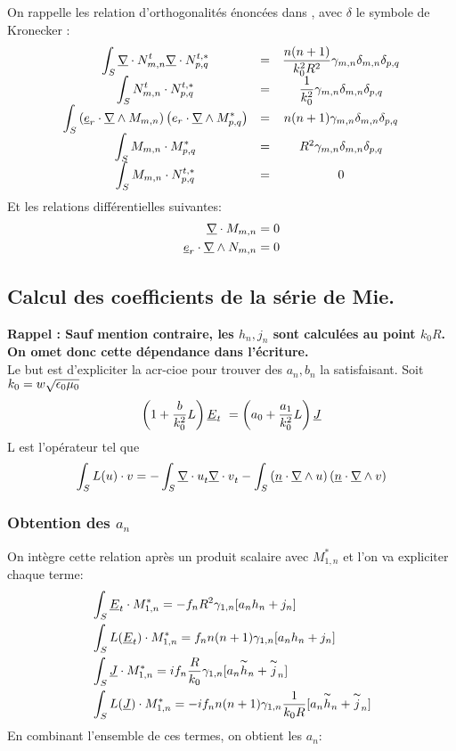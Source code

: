 On rappelle les relation d'orthogonalités énoncées dans \cite{marceaux_high-order_2000}, avec $\delta$ le symbole de Kronecker :
\[
  \begin{matrix}
    \displaystyle\int_S \underline{\nabla} \cdot N_{m,n}^t \underline{\nabla} \cdot N_{p,q}^{t,*} &=& \dfrac{n(n+1)}{k_0^2 R^2} \gamma_{m,n} \delta_{m,n} \delta_{p,q}\\
    \displaystyle\int_S N_{m,n}^t \cdot N_{p,q}^{t,*} &=& \dfrac{1}{k_0^2}\gamma_{m,n}\delta_{m,n} \delta_{p,q}\\
    \displaystyle\int_S \left(\underline{e}_r \cdot \underline{\nabla} \wedge M_{m,n}\right)\left( e_r \cdot \underline{\nabla} \wedge  M_{p,q}^{*}\right) &=& n(n+1) \gamma_{m,n} \delta_{m,n} \delta_{p,q}\\
    \displaystyle\int_S M_{m,n} \cdot M_{p,q}^{*} &=& R^2 \gamma_{m,n} \delta_{m,n} \delta_{p,q}\\
    \displaystyle\int_S M_{m,n} \cdot N_{p,q}^{t,*} &=& 0
  \end{matrix}
\]
Et les relations différentielles suivantes:
\begin{align*}
  \underline{\nabla} \cdot M_{m,n} &=0 \\
  \underline{e}_r \cdot \underline{\nabla} \wedge N_{m,n} &= 0
\end{align*}

\subsection{Calcul des coefficients de la série de Mie.}
\textbf{Rappel : Sauf mention contraire, les $h_n,j_n$ sont calculées au point $k_0R$. On omet donc cette dépendance dans l'écriture.}\\
Le but est d'expliciter la \gls{acr-cioe} pour trouver des $a_n, b_n$ la satisfaisant.
Soit $k_0 = w\sqrt{\epsilon_0\mu_0}$
\begin{equation}
  \label{eq:CIOE} \left(1+\dfrac{b}{k_0^2}L\right)\underline{E}_t\ = \left(a_0 + \dfrac{a_1}{k_0^2}L\right)\underline{J}
\end{equation}
L est l'opérateur tel que 
\[
  \int_{S} L(u)\cdot v = - \int_{S} {\underline{\nabla} \cdot u}_t {\underline{\nabla} \cdot v}_t - \int_{S}\left(\underline{n} \cdot \underline{\nabla} \wedge u\right)\left( \underline{n} \cdot \underline{\nabla} \wedge v\right)
\]
\subsubsection{Obtention des $a_n$}
On intègre cette relation après un produit scalaire avec $M_{1,n}^{*}$ et l'on va expliciter chaque terme:
\begin{align*}
  &\int_S \underline{E}_t\cdot M_{1,n}^{*} = - f_n R^2 \gamma_{1,n}[a_n h_n + j_n]\\
  &\int_S L(\underline{E}_t)\cdot M_{1,n}^{*} =  f_n n(n+1)\gamma_{1,n}[a_n h_n + j_n]\\
  &\int_S \underline{J} \cdot M_{1,n}^{*} =  i f_n \dfrac{R}{k_0} \gamma_{1,n}[a_n \overset{\thicksim}{h}_n + \overset{\thicksim}{j}_n]\\
  &\int_S L(\underline{J}) \cdot M_{1,n}^{*} =  - i f_n n(n+1) \gamma_{1,n}\dfrac{1}{k_0 R}[a_n \overset{\thicksim}{h}_n + \overset{\thicksim}{j}_n]\\
\end{align*}
En combinant l'ensemble de ces termes, on obtient les $a_n$:

